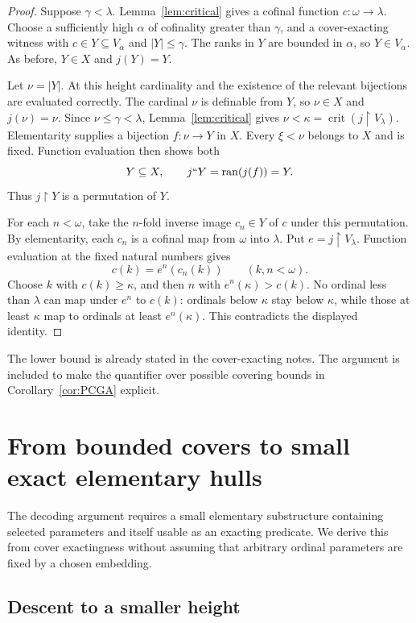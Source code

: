 \documentclass[11pt,letterpaper]{article}
\theoremstyle{definition}
\newcommand{\crit}{\operatorname{crit}}
\newcommand{\restr}{\mathbin{\upharpoonright}}
\begin{document}
\begin{proof}
Suppose $\gamma<\lambda$. Lemma~\ref{lem:critical} gives a cofinal function $c:\omega\to\lambda$. Choose a sufficiently high $\alpha$ of cofinality greater than $\gamma$, and a cover-exacting witness with $c\in Y\subseteq V_\alpha$ and $|Y|\leq\gamma$. The ranks in $Y$ are bounded in $\alpha$, so $Y\in V_\alpha$. As before, $Y\in X$ and $j(Y)=Y$.

Let $\nu=|Y|$. At this height cardinality and the existence of the relevant bijections are evaluated correctly. The cardinal $\nu$ is definable from $Y$, so $\nu\in X$ and $j(\nu)=\nu$. Since $\nu\leq\gamma<\lambda$, Lemma~\ref{lem:critical} gives $\nu<\kappa=\crit(j\restr V_\lambda)$. Elementarity supplies a bijection $f:\nu\to Y$ in $X$. Every $\xi<\nu$ belongs to $X$ and is fixed. Function evaluation then shows both
\[
 Y\subseteq X,\qquad
 j``Y=\operatorname{ran}(j(f))=Y.
\]
Thus $j\restr Y$ is a permutation of $Y$.

For each $n<\omega$, take the $n$-fold inverse image $c_n\in Y$ of $c$ under this permutation. By elementarity, each $c_n$ is a cofinal map from $\omega$ into $\lambda$. Put $e=j\restr V_\lambda$. Function evaluation at the fixed natural numbers gives
\[
 c(k)=e^n(c_n(k))\qquad(k,n<\omega).
\]
Choose $k$ with $c(k)\geq\kappa$, and then $n$ with $e^n(\kappa)>c(k)$. No ordinal less than $\lambda$ can map under $e^n$ to $c(k)$: ordinals below $\kappa$ stay below $\kappa$, while those at least $\kappa$ map to ordinals at least $e^n(\kappa)$. This contradicts the displayed identity.
\end{proof}

The lower bound is already stated in the cover-exacting notes.\cite{cover} The argument is included to make the quantifier over possible covering bounds in Corollary~\ref{cor:PCGA} explicit.

\section{From bounded covers to small exact elementary hulls}\label{sec:hulls}

The decoding argument requires a small elementary substructure containing selected parameters and itself usable as an exacting predicate. We derive this from cover exactingness without assuming that arbitrary ordinal parameters are fixed by a chosen embedding.

\subsection{Descent to a smaller height}
\end{document}
